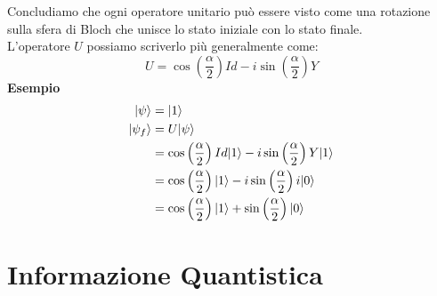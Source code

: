 \documentclass[12pt, a4paper]{report}
\begin{document}
Concludiamo che ogni operatore unitario può essere visto come una rotazione sulla sfera di Bloch che unisce lo stato iniziale con lo stato finale.\\
L'operatore $U$ possiamo scriverlo più generalmente come:
\begin{equation*}
    U = \cos\left(\frac{\alpha}{2}\right)Id - i\sin\left(\frac{\alpha}{2}\right)Y
\end{equation*}
\textbf{Esempio}
\begin{equation*}
    \begin{split}
        | \psi \rangle &= | 1 \rangle \\
        | \psi_{f} \rangle &= U| \psi \rangle \\
        &= \cos\left(\frac{\alpha}{2}\right)Id| 1 \rangle-i\sin\left(\frac{\alpha}{2}\right)Y| 1 \rangle \\
        &= \cos\left(\frac{\alpha}{2}\right)| 1 \rangle-i\sin\left(\frac{\alpha}{2}\right)i| 0 \rangle \\
        &= \cos\left(\frac{\alpha}{2}\right)| 1 \rangle+\sin\left(\frac{\alpha}{2}\right)| 0 \rangle \\
    \end{split}
\end{equation*}
\chapter{Informazione Quantistica}
\end{document}
